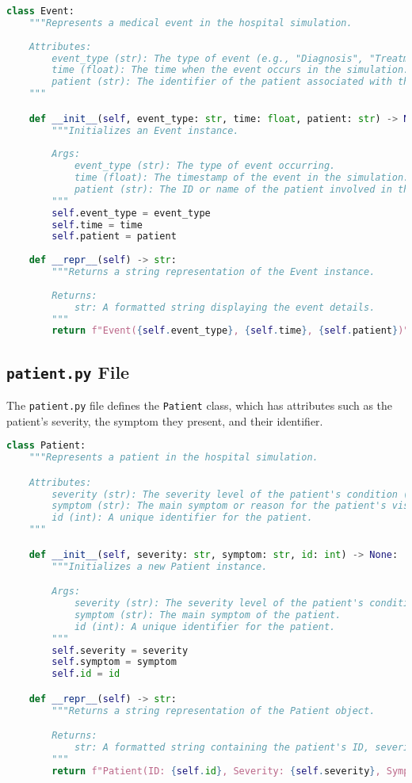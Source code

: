\documentclass[a4paper,12pt]{article}
\begin{document}
\begin{lstlisting}[language=Python]
class Event:
    """Represents a medical event in the hospital simulation.
    
    Attributes:
        event_type (str): The type of event (e.g., "Diagnosis", "Treatment").
        time (float): The time when the event occurs in the simulation.
        patient (str): The identifier of the patient associated with the event.
    """

    def __init__(self, event_type: str, time: float, patient: str) -> None:
        """Initializes an Event instance.
        
        Args:
            event_type (str): The type of event occurring.
            time (float): The timestamp of the event in the simulation.
            patient (str): The ID or name of the patient involved in the event.
        """
        self.event_type = event_type
        self.time = time
        self.patient = patient
    
    def __repr__(self) -> str:
        """Returns a string representation of the Event instance.
        
        Returns:
            str: A formatted string displaying the event details.
        """
        return f"Event({self.event_type}, {self.time}, {self.patient})"

\end{lstlisting}


\subsection{\texttt{patient.py} File}
The \texttt{patient.py} file defines the \texttt{Patient} class, which has attributes such as the patient's severity, the symptom they present, and their identifier.

\begin{lstlisting}[language=Python]
class Patient:
    """Represents a patient in the hospital simulation.

    Attributes:
        severity (str): The severity level of the patient's condition (e.g., "Mild", "Moderate", "Critical").
        symptom (str): The main symptom or reason for the patient's visit.
        id (int): A unique identifier for the patient.
    """

    def __init__(self, severity: str, symptom: str, id: int) -> None:
        """Initializes a new Patient instance.

        Args:
            severity (str): The severity level of the patient's condition.
            symptom (str): The main symptom of the patient.
            id (int): A unique identifier for the patient.
        """
        self.severity = severity
        self.symptom = symptom
        self.id = id

    def __repr__(self) -> str:
        """Returns a string representation of the Patient object.

        Returns:
            str: A formatted string containing the patient's ID, severity, and symptom.
        """
        return f"Patient(ID: {self.id}, Severity: {self.severity}, Symptom: {self.symptom})"

\end{lstlisting}
\end{document}

